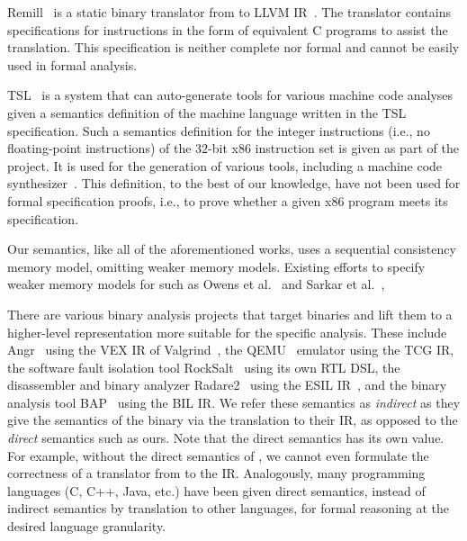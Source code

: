 Remill~\cite{McSema:Recon14} is a static binary translator from \ISA to LLVM
IR~\cite{LLVM:CGO04}. The translator contains specifications for \ISA instructions
in the form of equivalent C programs to assist the translation. This
specification is neither complete nor formal and cannot be easily used
in formal analysis.

TSL~\cite{TSL:TOPLAS13} is a system that can auto-generate tools for
various machine code analyses given a semantics definition of the machine
language written in the TSL specification. Such a semantics
definition for the integer instructions (i.e., no floating-point instructions) of the $32$-bit x86 instruction set is given
as part of the project. It is used for the generation of
various tools, including a machine code synthesizer~\cite{Srinivasan2015}.
This definition, to the best of our knowledge, have not been used
for formal specification proofs, i.e., to prove whether a given x86
program meets its specification.

Our semantics, like all of the aforementioned works, uses a sequential consistency memory model, omitting weaker memory models.
Existing efforts to specify weaker memory models for \ISA such as Owens et al.~\cite{Owens:x86-TSO} and Sarkar et al.~\cite{Sarkar:POPL09}, 

There are various binary analysis projects that target \ISA binaries
and lift them to a higher-level representation more suitable for the
specific analysis. These include Angr~\cite{Angr} using the VEX IR of Valgrind~\cite{Valgrind:ENTCS03}, the QEMU~\cite{QEMU:USENIX05} emulator
using the TCG IR, the software fault isolation tool RockSalt~\cite{Roclsalt:PLDI12} using its own RTL DSL, the disassembler and binary analyzer Radare2~\cite{Radare2} using the ESIL IR~\cite{ESIL}, and the binary analysis
tool BAP~\cite{BAP:CAV11} using the BIL IR.
We refer these semantics as \emph{indirect} as they give the semantics of the \ISA binary via the translation to their IR, as opposed to the \emph{direct} semantics such as ours.
Note that the direct semantics has its own value.
For example, without the direct semantics of \ISA, we cannot even formulate the correctness of a translator from \ISA to the IR.
Analogously, many programming languages (C, C++, Java, etc.) have been given direct semantics, instead of indirect semantics by translation to other languages, for formal reasoning at the desired language granularity. 

